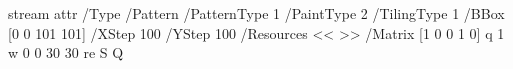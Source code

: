 
\immediate{}
\immediate\pdfobj stream attr{
 /Type /Pattern 
 /PatternType 1 %
 /PaintType 2 %
 /TilingType 1
 /BBox [0 0 101 101] 
 /XStep 100 
 /YStep 100 
 /Resources << >>
 /Matrix [1 0 0 1 0]
}{
q 1 w 0 0 30 30 re S Q
}
\expandafter\pdfpageresources{}

\bye

